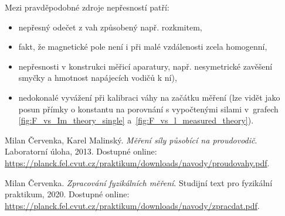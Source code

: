 \documentclass[a4paper,12pt]{article}
\begin{document}
Mezi pravděpodobné zdroje nepřesností patří:
\begin{itemize}
    \item nepřesný odečet z vah způsobený např. rozkmitem,
    \item fakt, že magnetické pole není i při malé vzdálenosti zcela homogenní,
    \item nepřesnosti v konstrukci měřicí aparatury, např. nesymetrické zavěšení smyčky a hmotnost napájecích vodičů k ní),
    \item nedokonalé vyvážení při kalibraci váhy na začátku měření (lze vidět jako posun přímky o konstantu na porovnání s vypočtenými silami v~grafech \ref{fig:F_vs_Im_theory_single} a~\ref{fig:F_vs_l_measured_theory}).
\end{itemize}


\begin{thebibliography}{}

    Milan Červenka, Karel Malinský. \textit{Měření síly působící na proudovodič}. Laboratorní úloha, 2013. Dostupné online: \url{https://planck.fel.cvut.cz/praktikum/downloads/navody/proudovahy.pdf}.

    Milan Červenka. \textit{Zpracování fyzikálních měření}. Studijní text pro fyzikální praktikum, 2020. Dostupné online: \url{https://planck.fel.cvut.cz/praktikum/downloads/navody/zpracdat.pdf}.

\end{thebibliography}
\end{document}
